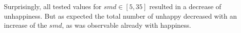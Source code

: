 Surprisingly, all tested values for $smd \in [5,35]$ resulted in a decrease of unhappiness. But as expected the total number of unhappy decreased with an increase of the $smd$, as was observable already with happiness.




